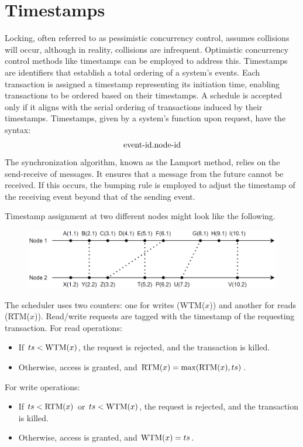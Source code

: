 \section{Timestamps}

Locking, often referred to as pessimistic concurrency control, assumes collisions will occur, although in reality, collisions are infrequent.
Optimistic concurrency control methods like timestamps can be employed to address this. 
Timestamps are identifiers that establish a total ordering of a system's events. 
Each transaction is assigned a timestamp representing its initiation time, enabling transactions to be ordered based on their timestamps. 
A schedule is accepted only if it aligns with the serial ordering of transactions induced by their timestamps. 
Timestamps, given by a system's function upon request, have the syntax:
\[\textnormal{event-id}.\textnormal{node-id}\]
The synchronization algorithm, known as the Lamport method, relies on the send-receive of messages. 
It ensures that a message from the future cannot be received. 
If this occurs, the bumping rule is employed to adjust the timestamp of the receiving event beyond that of the sending event.  
\begin{example}
    Timestamp assignment at two different nodes might look like the following.
    \begin{figure}[H]
        \centering
        \includegraphics[width=0.75\linewidth]{images/timestamps.png}
    \end{figure}
\end{example}
The scheduler uses two counters: one for writes (WTM($x$)) and another for reads (RTM($x$)).
Read/write requests are tagged with the timestamp of the requesting transaction.
For read operations:
\begin{itemize}
    \item If $ts<\textnormal{WTM}(x)$, the request is rejected, and the transaction is killed.
    \item Otherwise, access is granted, and $\textnormal{RTM}(x)=\max(\textnormal{RTM}(x),ts)$. 
\end{itemize}
For write operations:
\begin{itemize}
    \item If $ts<\textnormal{RTM}(x)$ or $ts<\textnormal{WTM}(x)$, the request is rejected, and the transaction is killed.
    \item Otherwise, access is granted, and $\textnormal{WTM}(x)=ts$. 
\end{itemize}
